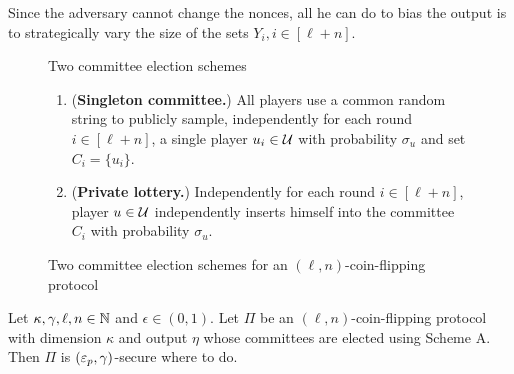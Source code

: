     Since the adversary cannot change the nonces, 
    all he can do to bias the output 
    is to strategically vary the size of the sets $Y_i, i \in [\ell + n]$.

    \begin{figure}[h]
        \begin{framed}
            \begin{center}
                Two committee election schemes                
            \end{center}
            \begin{enumerate}[label=\textbf{Scheme \Alph*:},ref=\Alph*,leftmargin=6em]
                \item \label{lottery:public}
                (\textbf{Singleton committee.})
                All players use a common random string to 
                publicly sample, 
                independently for each round $i \in [\ell + n]$, 
                a single player $u_i \in \mathcal{U}$   
                with probability $\sigma_u$ and 
                set $C_i = \{u_i\}$. 

                \item \label{lottery:private}
                (\textbf{Private lottery.})
                Independently for each round $i \in [\ell + n]$, 
                player $u \in \mathcal{U}$ 
                independently inserts himself 
                into the committee $C_i$ 
                with probability $\sigma_u$. 
            \end{enumerate}
        \end{framed}
        \caption{Two committee election schemes for an $(\ell, n)$-coin-flipping protocol}
        \label{fig:leader-election-schemes}
    \end{figure}


    \begin{theorem}
        Let $\kappa, \gamma, \ell, n \in \mathbb{N}$ and $\epsilon \in (0,1)$.
        Let $\Pi$ be an $(\ell, n)$-coin-flipping protocol with dimension $\kappa$ 
        and output $\eta$ whose committees are elected using Scheme A.
        Then $\Pi$ is $(\mathsf{\varepsilon}_p, \gamma)$-secure where {\color{red} to do}.
    \end{theorem}

